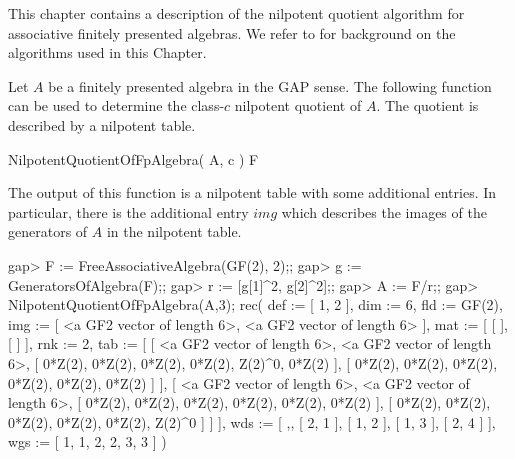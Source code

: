 

This chapter contains a description of the nilpotent quotient algorithm
for associative finitely presented algebras. We refer to \cite{Eic11} for 
background on the algorithms used in this Chapter.


Let $A$ be a finitely presented algebra in the GAP sense. The following
function can be used to determine the class-$c$ nilpotent quotient of $A$.
The quotient is described by a nilpotent table.

\> NilpotentQuotientOfFpAlgebra( A, c ) F

The output of this function is a nilpotent table with some additional
entries. In particular, there is the additional entry $img$ which 
describes the images of the generators of $A$ in the nilpotent table.


\beginexample
gap> F := FreeAssociativeAlgebra(GF(2), 2);;
gap> g := GeneratorsOfAlgebra(F);;
gap> r := [g[1]^2, g[2]^2];;
gap> A := F/r;;
gap> NilpotentQuotientOfFpAlgebra(A,3);
rec( def := [ 1, 2 ], dim := 6, fld := GF(2), 
  img := [ <a GF2 vector of length 6>, <a GF2 vector of length 6> ], 
  mat := [ [  ], [  ] ], rnk := 2, 
  tab := [ [ <a GF2 vector of length 6>, <a GF2 vector of length 6>, 
          [ 0*Z(2), 0*Z(2), 0*Z(2), 0*Z(2), Z(2)^0, 0*Z(2) ], 
          [ 0*Z(2), 0*Z(2), 0*Z(2), 0*Z(2), 0*Z(2), 0*Z(2) ] ], 
      [ <a GF2 vector of length 6>, <a GF2 vector of length 6>, 
          [ 0*Z(2), 0*Z(2), 0*Z(2), 0*Z(2), 0*Z(2), 0*Z(2) ], 
          [ 0*Z(2), 0*Z(2), 0*Z(2), 0*Z(2), 0*Z(2), Z(2)^0 ] ] ], 
  wds := [ ,, [ 2, 1 ], [ 1, 2 ], [ 1, 3 ], [ 2, 4 ] ], 
  wgs := [ 1, 1, 2, 2, 3, 3 ] )
\endexample
